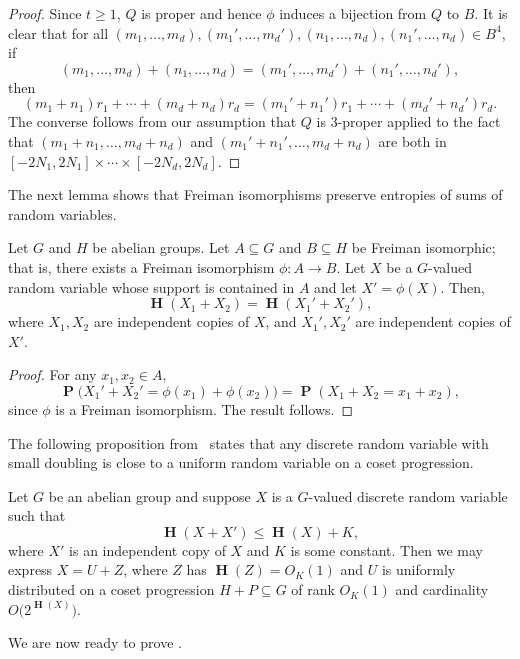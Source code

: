 \documentclass[twoside, 10pt]{article}
\DeclareMathOperator{\Eta}{\mathbf{H}}
\DeclareMathOperator{\pr}{\mathbf{P}}
\begin{document}
\begin{proof}
Since $t\ge 1$, $Q$ is proper and hence $\phi$ induces a bijection from $Q$ to $B$. It is clear that for all $(m_1,\ldots,m_d), (m_1',\ldots,m_d'), (n_1,\ldots,n_d), (n_1',\ldots,n_d) \in B^4$, if
$$(m_1,\ldots,m_d) + (n_1,\ldots, n_d)
= (m_1',\ldots,m_d') + (n_1',\ldots,n_d'),$$
then
$$(m_1+n_1)r_1 + \cdots + (m_d+n_d)r_d = (m_1'+n_1')r_1 + \cdots + (m_d'+n_d')r_d.$$
The converse follows from our assumption that $Q$ is $3$-proper applied to the fact that $(m_1+n_1, \ldots, m_d + n_d)$
and $(m_1'+n_1', \ldots, m_d+n_d)$ are both in $[-2N_1, 2N_1]\times\cdots\times[-2N_d, 2N_d]$.
\end{proof}

The next lemma shows that Freiman isomorphisms preserve entropies of sums of random variables.

\begin{lemma}\label{lemfreiman}
Let $G$ and $H$ be abelian groups. Let $A\subseteq G$ and
$B\subseteq H$ be Freiman isomorphic; that is, there exists a Freiman isomorphism $\phi:A\to B$.
Let $X$ be a $G$-valued random variable whose support is contained in $A$
and let $X' = \phi(X)$.
Then,
$$\Eta(X_1 + X_2) = \Eta(X_1' + X_2'),$$
where $X_1,X_2$ are independent copies of $X$, and $X_1',X_2'$ are 
independent copies
of $X'$.
\end{lemma}

\begin{proof}
For any $x_1,x_2\in A$,
$$\pr\bigl( X_1' + X_2' = \phi(x_1) + \phi(x_2) \bigr) 
= \pr(X_1 + X_2 = x_1 + x_2),$$
since $\phi$ is a Freiman isomorphism. The result follows.
\end{proof}

The following proposition from~\cite{tao2010} states that
any discrete random variable with small doubling is close
to a uniform random variable on a coset progression.

\begin{proposition}
\label{proptaofivetwo}
Let $G$ be an abelian group and suppose $X$ is a
$G$-valued discrete random variable such that
$$\Eta(X+X') \le \Eta(X) + K,$$
where $X'$ is an independent copy of $X$ and $K$ is some constant. Then
we may express $X = U+Z$, where 
$Z$ has $\Eta(Z) = O_K(1)$ and
$U$ is 
uniformly distributed on a coset progression 
$H+P\subseteq G$ of rank $O_K(1)$ and
cardinality $O\bigl(2^{\Eta(X)}\bigr)$.
\end{proposition}

We are now ready to prove .
\end{document}
